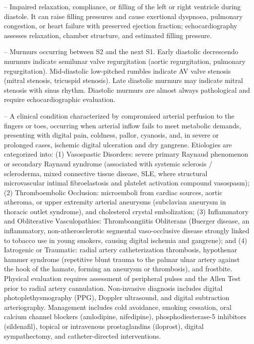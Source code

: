 -- Impaired relaxation, compliance, or filling of the left or right ventricle during diastole. It can raise filling pressures and cause exertional dyspnoea, pulmonary congestion, or heart failure with preserved ejection fraction; echocardiography assesses relaxation, chamber structure, and estimated filling pressure.

-- Murmurs occurring between S2 and the next S1. Early diastolic decrescendo murmurs indicate semilunar valve regurgitation (aortic regurgitation, pulmonary regurgitation). Mid-diastolic low-pitched rumbles indicate AV valve stenosis (mitral stenosis, tricuspid stenosis). Late diastolic murmurs may indicate mitral stenosis with sinus rhythm. Diastolic murmurs are almost always pathological and require echocardiographic evaluation.

-- A clinical condition characterized by compromised arterial perfusion to the fingers or toes, occurring when arterial inflow fails to meet metabolic demands, presenting with digital pain, coldness, pallor, cyanosis, and, in severe or prolonged cases, ischemic digital ulceration and dry gangrene. Etiologies are categorized into: (1) Vasospastic Disorders: severe primary Raynaud phenomenon or secondary Raynaud syndrome (associated with systemic sclerosis / scleroderma, mixed connective tissue disease, SLE, where structural microvascular intimal fibroelastosis and platelet activation compound vasospasm); (2) Thromboembolic Occlusion: microemboli from cardiac sources, aortic atheroma, or upper extremity arterial aneurysms (subclavian aneurysm in thoracic outlet syndrome), and cholesterol crystal embolization; (3) Inflammatory and Obliterative Vasculopathies: Thromboangiitis Obliterans (Buerger disease, an inflammatory, non-atherosclerotic segmental vaso-occlusive disease strongly linked to tobacco use in young smokers, causing digital ischemia and gangrene); and (4) Iatrogenic or Traumatic: radial artery catheterization thrombosis, hypothenar hammer syndrome (repetitive blunt trauma to the palmar ulnar artery against the hook of the hamate, forming an aneurysm or thrombosis), and frostbite. Physical evaluation requires assessment of peripheral pulses and the Allen Test prior to radial artery cannulation. Non-invasive diagnosis includes digital photoplethysmography (PPG), Doppler ultrasound, and digital subtraction arteriography. Management includes cold avoidance, smoking cessation, oral calcium channel blockers (amlodipine, nifedipine), phosphodiesterase-5 inhibitors (sildenafil), topical or intravenous prostaglandins (iloprost), digital sympathectomy, and catheter-directed interventions.

